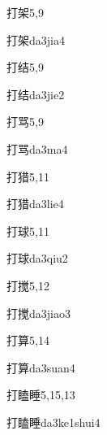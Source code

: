 \begin{entry}{打架}{5,9}
  \begin{phonetics}{打架}{da3jia4}
  \end{phonetics}
\end{entry}

\begin{entry}{打结}{5,9}
  \begin{phonetics}{打结}{da3jie2}
  \end{phonetics}
\end{entry}

\begin{entry}{打骂}{5,9}
  \begin{phonetics}{打骂}{da3ma4}
  \end{phonetics}
\end{entry}

\begin{entry}{打猎}{5,11}
  \begin{phonetics}{打猎}{da3lie4}
  \end{phonetics}
\end{entry}

\begin{entry}{打球}{5,11}
  \begin{phonetics}{打球}{da3qiu2}
  \end{phonetics}
\end{entry}

\begin{entry}{打搅}{5,12}
  \begin{phonetics}{打搅}{da3jiao3}
  \end{phonetics}
\end{entry}

\begin{entry}{打算}{5,14}
  \begin{phonetics}{打算}{da3suan4}
  \end{phonetics}
\end{entry}

\begin{entry}{打瞌睡}{5,15,13}
  \begin{phonetics}{打瞌睡}{da3ke1shui4}
  \end{phonetics}
\end{entry}


